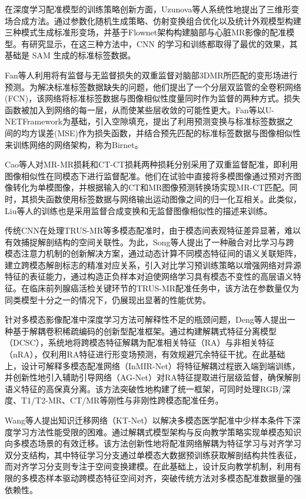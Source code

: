 在深度学习配准模型的训练策略创新方面，Uzunova等人系统性地提出了三维形变场合成方法\cite{uzunova2017training}。通过参数化随机生成策略、仿射变换组合优化以及统计外观模型构建三种模式生成标准形变场，并基于Flownet架构\cite{dosovitskiy2015flownet}构建脑部与心脏MR影像的配准模型。有研究显示，在这三种方法中，CNN 的学习和训练都取得了最优的效果，其基础是 SAM 生成的标准标签数据。

Fan等人利用将有监督与无监督损失的双重监督对脑部3DMR所匹配的变形场进行预测。为解决标准标签数据缺失的问题，他们提出了一个分层双监管的全卷积网络(FCN)\cite{long2015fully}，该网络将标准标签数据与图像相似性度量同时作为监督的两种方式。损失函数被加入到网络的每一层，从而使某些层收敛的可能性更大。Fan等以U-NETFramework\cite{ronneberger2015u}为基础，引入空隙填充，提出了利用预测变换与标准标签数据之间的均方误差(MSE)作为损失函数，并结合预先匹配的标准标签数据与图像相似性来训练网络的网络架构，称为Birnet。

Cao等人对MR-MR损耗和CT-CT损耗两种损耗分别采用了双重监督配准\cite{cao2018deep}，即利用图像相似性在同模态下进行监督配准。他们在试验中直接将多模图像通过预对齐图像转化为单模图像，并根据输入的CT和MR图像预测转换场实现MR-CT匹配。同时，其损失函数使用标签数据与网络输出运动图像之间的归一化互相关。此类似，Liu等人的训练也是采用监督合成变换和无监督图像相似性的描述来训练\cite{liu2019multimodal}。

传统CNN在处理TRUS-MR等多模态配准时，由于模态间表观特征差异显著，难以有效捕捉解剖结构的空间关联性。为此，Song等人\cite{song2022cross}提出了一种融合对比学习与跨模态注意力机制的创新解决方案，通过动态计算不同模态特征间的语义关联矩阵，建立跨模态解剖标志的精准对应关系，引入对比学习预训练策略以增强网络对异源特征的表征能力，通过构造正负样本对迫使网络学习具有模态不变性的高层语义特征。在临床前列腺癌活检关键环节的TRUS-MR配准任务中，该方法在参数量仅为同类模型十分之一的情况下，仍展现出显著的性能优势。

针对多模态影像配准中深度学习方法可解释性不足的瓶颈问题，Deng等人提出一种基于解耦卷积稀疏编码的创新型配准框架\cite{deng2023interpretable}。通过构建解耦式特征分离模型（DCSC），系统地将跨模态特征解耦为配准相关特征（RA）与非相关特征（nRA），仅利用RA特征进行形变场预测，有效规避冗余特征干扰。在此基础上，设计可解释多模态配准网络（InMIR-Net）将特征解耦过程嵌入端到端训练，并创新性地引入辅助引导网络（AG-Net）对RA特征提取进行层级监督，确保解剖语义特征的高保真分离。该方法突破性地构建了统一框架，可同时处理RGB/深度、T1/T2-MR、CT/MR等刚性与非刚性跨模态配准任务。

Wang等人提出知识迁移网络（KT-Net）\cite{wang2023few}以解决多模态医学配准中少样本条件下深度学习方法性能受限的困难。通过解耦式模型架构与反向教学策略实现单模态知识向多模态场景的有效迁移。该方法创新性地将配准网络解耦为特征学习与对齐学习双分支结构，其中特征学习分支通过单模态大数据预训练获取解剖结构共性表征，而对齐学习分支则专注于空间变换建模。在此基础上，设计反向教学机制，利用有限的多模态样本驱动跨模态特征空间对齐，突破传统方法对多模态配准数据量的强依赖性。


